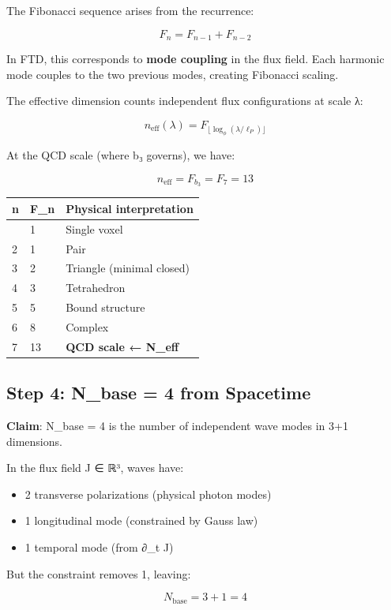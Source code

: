 \documentclass[
  11pt,
  letterpaper,
  twoside,
  openany]{book}
\makeatletter
\providecommand{\tightlist}{%
  \setlength{\itemsep}{0pt}\setlength{\parskip}{0pt}}
\let\orig@subsection\subsection
\renewcommand{\subsection}{\needspace{6\baselineskip}\orig@subsection}
\makeatother
\begin{document}
The Fibonacci sequence arises from the recurrence:

\[F_n = F_{n-1} + F_{n-2}\]

In FTD, this corresponds to \textbf{mode coupling} in the flux field.
Each harmonic mode couples to the two previous modes, creating Fibonacci
scaling.

The effective dimension counts independent flux configurations at scale
λ:

\[n_{\text{eff}}(\lambda) = F_{\lfloor \log_\phi(\lambda/\ell_P) \rfloor}\]

At the QCD scale (where b₃ governs), we have:

\[n_{\text{eff}} = F_{b_3} = F_7 = 13\]

\begin{longtable}[]{@{}lll@{}}
\toprule\noalign{}
n & F\_n & Physical interpretation \\
\midrule\noalign{}
\endhead
\bottomrule\noalign{}
\endlastfoot
1 & 1 & Single voxel \\
2 & 1 & Pair \\
3 & 2 & Triangle (minimal closed) \\
4 & 3 & Tetrahedron \\
5 & 5 & Bound structure \\
6 & 8 & Complex \\
7 & 13 & \textbf{QCD scale ← N\_eff} \\
\end{longtable}

\subsection{Step 4: N\_base = 4 from
Spacetime}\label{step-4-n_base-4-from-spacetime}

\textbf{Claim}: N\_base = 4 is the number of independent wave modes in
3+1 dimensions.

In the flux field J ∈ ℝ³, waves have:

\begin{itemize}
\tightlist
\item
  2 transverse polarizations (physical photon modes)
\item
  1 longitudinal mode (constrained by Gauss law)
\item
  1 temporal mode (from ∂\_t J)
\end{itemize}

But the constraint removes 1, leaving:

\[N_{\text{base}} = 3 + 1 = 4\]
\end{document}
